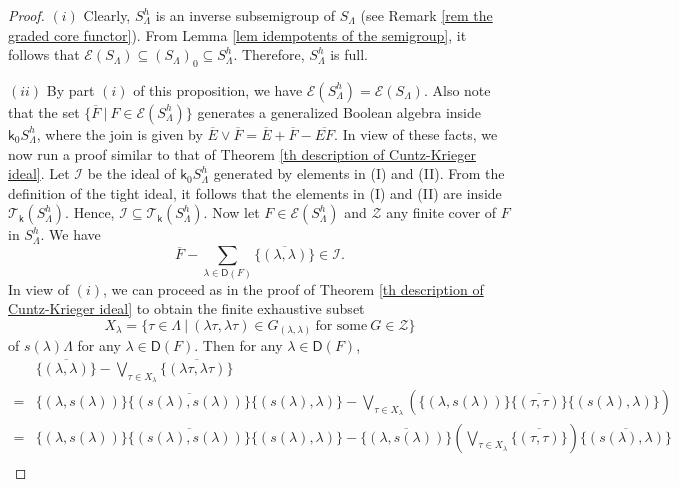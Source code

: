 \documentclass[a4paper,reqno,11pt]{amsart}
\numberwithin{equation}{section}
\theoremstyle{definition}
\theoremstyle{remark}
\begin{document}
\begin{proof}
$(i)$ Clearly, $S_\Lambda^h$ is an inverse subsemigroup of $S_\Lambda$ (see Remark \ref{rem the graded core functor}). From Lemma \ref{lem idempotents of the semigroup}, it follows that $\mathcal{E}(S_\Lambda)\subseteq (S_\Lambda)_0\subseteq S_\Lambda^h$. Therefore, $S_\Lambda^h$ is full. 

$(ii)$ By part $(i)$ of this proposition, we have $\mathcal{E}(S_\Lambda^h)=\mathcal{E}(S_\Lambda)$. Also note that the set $\{\overline{F}~|~F\in \mathcal{E}(S_\Lambda^h)\}$ generates a generalized Boolean algebra inside $\mathsf{k}_0S_\Lambda^h$, where the join is given by $\overline{E}\vee \overline{F}=\overline{E}+\overline{F}-\overline{EF}$. In view of these facts, we now run a proof similar to that of Theorem \ref{th description of Cuntz-Krieger ideal}. Let $\mathcal{I}$ be the ideal of $\mathsf{k}_0S_\Lambda^h$ generated by elements in (I) and (II). From the definition of the tight ideal, it follows that the elements in (I) and (II) are inside $\mathcal{T}_\mathsf{k}(S_\Lambda^h)$. Hence, $\mathcal{I}\subseteq \mathcal{T}_\mathsf{k}(S_\Lambda^h)$. Now let $F\in \mathcal{E}(S_\Lambda^h)$ and $\mathcal{Z}$ any finite cover of $F$ in $S_\Lambda^h$. We have 
\begin{equation}\label{eq TI1}
\overline{F}-\displaystyle{\sum_{\lambda\in \mathsf{D}(F)}}\overline{\{(\lambda,\lambda)\}}\in \mathcal{I}.   
\end{equation}
In view of $(i)$, we can proceed as in the proof of Theorem \ref{th description of Cuntz-Krieger ideal} to obtain the finite exhaustive subset \[X_\lambda=\{\tau\in \Lambda~|~(\lambda\tau,\lambda\tau)\in G_{(\lambda,\lambda)}~\text{for some}~G\in \mathcal{Z}\}\] of $s(\lambda)\Lambda$ for any $\lambda\in \mathsf{D}(F)$. Then for any $\lambda\in \mathsf{D}(F)$, 
\begin{align*}
&\overline{\{(\lambda,\lambda)\}}-\displaystyle{\bigvee_{\tau\in X_\lambda}}\overline{\{(\lambda\tau,\lambda\tau)\}}\\
=&\overline{\{(\lambda,s(\lambda))\}\{(s(\lambda),s(\lambda))\}\{(s(\lambda),\lambda)\}}-\displaystyle{\bigvee_{\tau\in X_\lambda}}\left(\overline{\{(\lambda,s(\lambda))\}\{(\tau,\tau)\}\{(s(\lambda),\lambda)\}}\right)\\
=&\overline{\{(\lambda,s(\lambda))\}\{(s(\lambda),s(\lambda))\}\{(s(\lambda),\lambda)\}}-\overline{\{(\lambda,s(\lambda))\}}\left(\displaystyle{\bigvee_{\tau\in X_\lambda}}\overline{\{(\tau,\tau)\}}\right)\overline{\{(s(\lambda),\lambda)\}}\\

\end{align*}
\end{proof}
\end{document}
